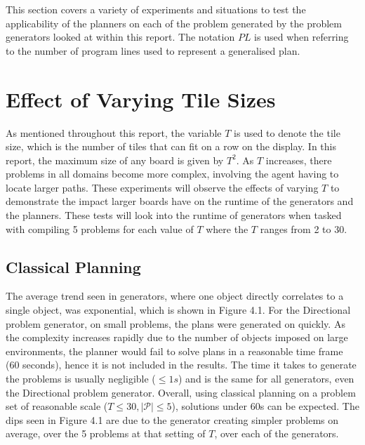 This section covers a variety of experiments and situations to test the applicability of the planners on each of the problem generated by the problem generators looked at within this report. The notation $PL$ is used when referring to the number of program lines used to represent a generalised plan.

\section{Effect of Varying Tile Sizes}
As mentioned throughout this report, the variable $T$ is used to denote the tile size, which is the number of tiles that can fit on a row on the display. In this report, the maximum size of any board is given by $T^2$. As $T$ increases, there problems in all domains become more complex, involving the agent having to locate larger paths. These experiments will observe the effects of varying $T$ to demonstrate the impact larger boards have on the runtime of the generators and the planners. These tests will look into the runtime of generators when tasked with compiling 5 problems for each value of $T$ where the $T$ ranges from 2 to 30.

\subsection{Classical Planning}
The average trend seen in generators, where one object directly correlates to a single object, was exponential, which is shown in Figure 4.1. For the Directional problem generator, on small problems, the plans were generated on quickly. As the complexity increases rapidly due to the number of objects imposed on large environments, the planner would fail to solve plans in a reasonable time frame (60 seconds), hence it is not included in the results. The time it takes to generate the problems is usually negligible ($\leq 1s$) and is the same for all generators, even the Directional problem generator. Overall, using classical planning on a problem set of reasonable scale ($T \leq 30, |\mathcal{P}| \leq 5$), solutions under 60s can be expected. The dips seen in Figure 4.1 are due to the generator creating simpler problems on average, over the 5 problems at that setting of $T$, over each of the generators.

